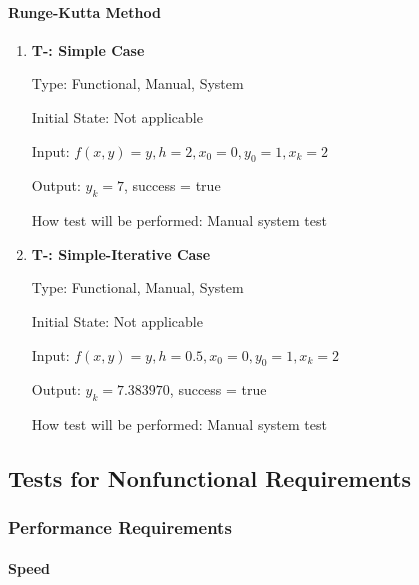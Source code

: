 \documentclass[12pt, titlepage]{article}
\newcounter{tnum} %
\begin{document}
\paragraph{Runge-Kutta Method}
\begin{enumerate}

\item{\textbf{T-\thetnum \label{t-rk_simple}: Simple Case}}

Type: Functional, Manual, System %
					
Initial State: Not applicable
					
Input: $f(x, y) = y, h = 2, x_0 = 0, y_0 = 1, x_k = 2$
					
Output: $y_k = 7$, success = true
					
How test will be performed: Manual system test

\item{\textbf{T-\thetnum \label{t-rk_simpleiterative}: Simple-Iterative Case}}

Type: Functional, Manual, System %
					
Initial State: Not applicable
					
Input: $f(x, y) = y, h = 0.5, x_0 = 0, y_0 = 1, x_k = 2$
					
Output: $y_k = 7.383970$, success = true
					
How test will be performed: Manual system test

\end{enumerate}

%

\subsection{Tests for Nonfunctional Requirements}

\subsubsection{Performance Requirements}
		
\paragraph{Speed}
\end{document}
